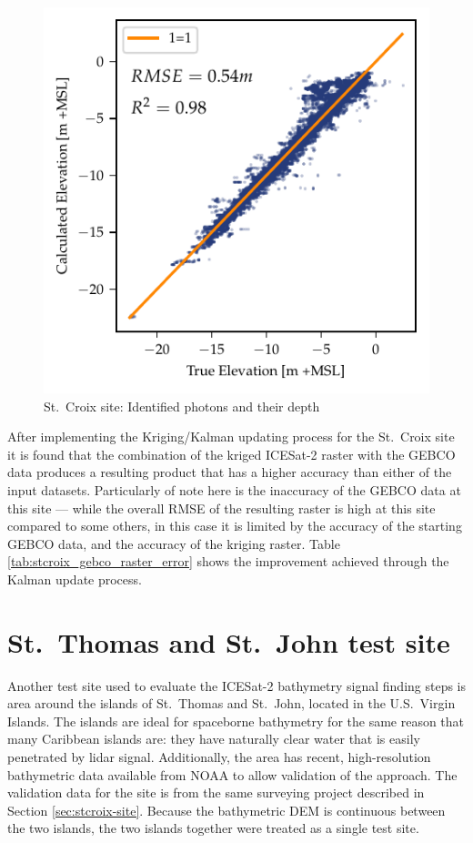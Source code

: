 \begin{figure}[htbp]
    \centering
    \includegraphics{figures/stcroix_lidar_estimated_vs_truth.pdf}
    \caption{St.~Croix site: Identified photons and their depth}
    \label{fig:st-croix-bias-plot}
\end{figure}

After implementing the Kriging/Kalman updating process for the St.~Croix site it is found that the combination of the kriged ICESat-2 raster with the GEBCO data produces a resulting product that has a higher accuracy than either of the input datasets. Particularly of note here is the inaccuracy of the GEBCO data at this site --- while the overall RMSE of the resulting raster is high at this site compared to some others, in this case it is limited by the accuracy of the starting GEBCO data, and the accuracy of the kriging raster. Table \ref{tab:stcroix_gebco_raster_error} shows the improvement achieved through the Kalman update process.



\section{St.~Thomas and St.~John test site}
Another test site used to evaluate the ICESat-2 bathymetry signal finding steps is area around the islands of St.~Thomas and St.~John, located in the U.S.~Virgin Islands. The islands are ideal for spaceborne bathymetry for the same reason that many Caribbean islands are: they have naturally clear water that is easily penetrated by lidar signal. Additionally, the area has recent, high-resolution bathymetric data available from NOAA to allow validation of the approach. The validation data for the site is from the same surveying project described in Section \ref{sec:stcroix-site}. Because the bathymetric DEM is continuous between the two islands, the two islands together were treated as a single test site.  

